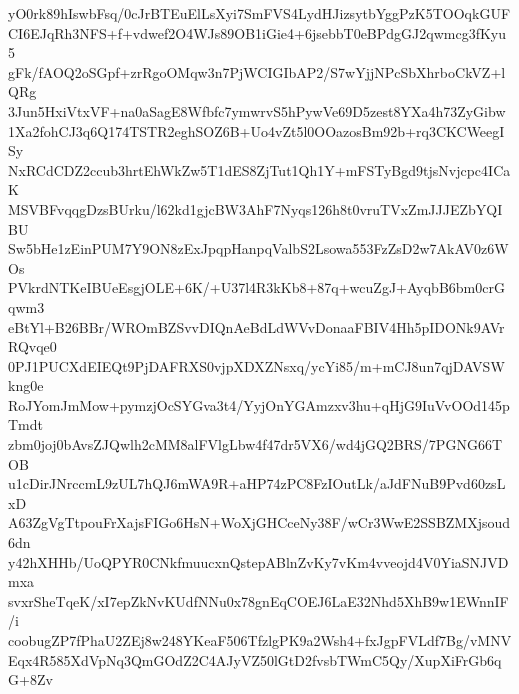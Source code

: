 yO0rk89hIswbFsq/0cJrBTEuElLsXyi7SmFVS4LydHJizsytbYggPzK5TOOqkGUF
CI6EJqRh3NFS+f+vdwef2O4WJs89OB1iGie4+6jsebbT0eBPdgGJ2qwmcg3fKyu5
gFk/fAOQ2oSGpf+zrRgoOMqw3n7PjWCIGIbAP2/S7wYjjNPcSbXhrboCkVZ+lQRg
3Jun5HxiVtxVF+na0aSagE8Wfbfc7ymwrvS5hPywVe69D5zest8YXa4h73ZyGibw
1Xa2fohCJ3q6Q174TSTR2eghSOZ6B+Uo4vZt5l0OOazosBm92b+rq3CKCWeegISy
NxRCdCDZ2ccub3hrtEhWkZw5T1dES8ZjTut1Qh1Y+mFSTyBgd9tjsNvjcpc4ICaK
MSVBFvqqgDzsBUrku/l62kd1gjcBW3AhF7Nyqs126h8t0vruTVxZmJJJEZbYQIBU
Sw5bHe1zEinPUM7Y9ON8zExJpqpHanpqValbS2Lsowa553FzZsD2w7AkAV0z6WOs
PVkrdNTKeIBUeEsgjOLE+6K/+U37l4R3kKb8+87q+wcuZgJ+AyqbB6bm0crGqwm3
eBtYl+B26BBr/WROmBZSvvDIQnAeBdLdWVvDonaaFBIV4Hh5pIDONk9AVrRQvqe0
0PJ1PUCXdEIEQt9PjDAFRXS0vjpXDXZNsxq/ycYi85/m+mCJ8un7qjDAVSWkng0e
RoJYomJmMow+pymzjOcSYGva3t4/YyjOnYGAmzxv3hu+qHjG9IuVvOOd145pTmdt
zbm0joj0bAvsZJQwlh2cMM8alFVlgLbw4f47dr5VX6/wd4jGQ2BRS/7PGNG66TOB
u1cDirJNrccmL9zUL7hQJ6mWA9R+aHP74zPC8FzIOutLk/aJdFNuB9Pvd60zsLxD
A63ZgVgTtpouFrXajsFIGo6HsN+WoXjGHCceNy38F/wCr3WwE2SSBZMXjsoud6dn
y42hXHHb/UoQPYR0CNkfmuucxnQstepABlnZvKy7vKm4vveojd4V0YiaSNJVDmxa
svxrSheTqeK/xI7epZkNvKUdfNNu0x78gnEqCOEJ6LaE32Nhd5XhB9w1EWnnIF/i
coobugZP7fPhaU2ZEj8w248YKeaF506TfzlgPK9a2Wsh4+fxJgpFVLdf7Bg/vMNV
Eqx4R585XdVpNq3QmGOdZ2C4AJyVZ50lGtD2fvsbTWmC5Qy/XupXiFrGb6qG+8Zv
